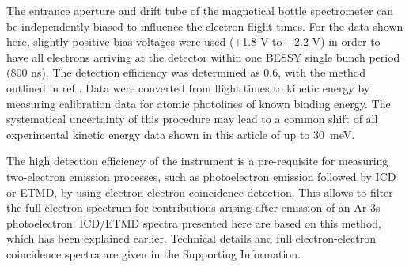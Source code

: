 The entrance aperture and drift tube of the magnetical bottle spectrometer can be independently biased to influence the electron flight times. 
For the data shown here, slightly positive bias voltages were used (+1.8 V to +2.2 V) in order to have all electrons arriving at the detector within one BESSY single bunch period (800 ns). 
The detection efficiency was determined as 0.6, with the method outlined in ref .
Data were converted from flight times to kinetic energy by measuring calibration data for atomic photolines of known binding energy.
The systematical uncertainty of this procedure may lead to a common shift of all experimental kinetic energy data shown in this article of up to 30~meV.

The high detection efficiency of the instrument is a pre-requisite for measuring two-electron emission processes, such as photoelectron emission followed by ICD or ETMD, by using electron-electron coincidence detection. 
This allows to filter the full electron spectrum for contributions arising after emission of an Ar 3s photoelectron.
ICD/ETMD spectra presented here are based on this method, which has been explained earlier.\cite{mucke_review,Foerstel_phd}
Technical details and full electron-electron coincidence spectra are given in the Supporting Information.
